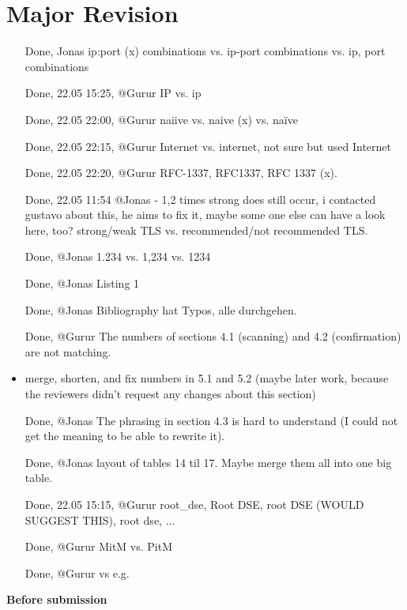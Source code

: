 \onecolumn

\section{Major Revision}
\begin{itemize}
    \item [Done, Jonas] ip:port (x) combinations vs. ip-port combinations vs. ip, port combinations
    \item [Done, 22.05 15:25, @Gurur] IP vs. ip
    \item [Done, 22.05 22:00, @Gurur] naiive vs. naive (x) vs. naïve
    \item [Done, 22.05 22:15, @Gurur] Internet vs. internet, not sure but used Internet
    \item [Done, 22.05 22:20, @Gurur] RFC-1337, RFC1337, RFC 1337 (x).
    \item [Done, 22.05 11:54 @Jonas - 1,2 times strong does still occur, i contacted gustavo about this, he aims to fix it, maybe some one else can have a look here, too?]strong/weak TLS vs. recommended/not recommended TLS.
    \item [Done, @Jonas] 1.234 vs. 1,234 vs. 1234
    \item [Done, @Jonas] Listing 1
    \item [Done, @Jonas] Bibliography hat Typos, alle durchgehen.
    \item [Done, @Gurur] The numbers of sections 4.1 (scanning) and 4.2 (confirmation) are not matching.
    \item merge, shorten, and fix numbers in 5.1 and 5.2 (maybe later work, because the reviewers didn't request any changes about this section)
    \item [Done, @Jonas] The phrasing in section 4.3 is hard to understand (I could not get the meaning to be able to rewrite it).
    \item [Done, @Jonas] layout of tables 14 til 17. Maybe merge them all into one big table.
    \item [Done, 22.05 15:15, @Gurur] root\_dse, Root DSE, root DSE (WOULD SUGGEST THIS), root dse, ...
    \item [Done, @Gurur] MitM vs. PitM
    \item [Done, @Gurur] \eg vs e.g.
\end{itemize}

\textbf{Before submission}
